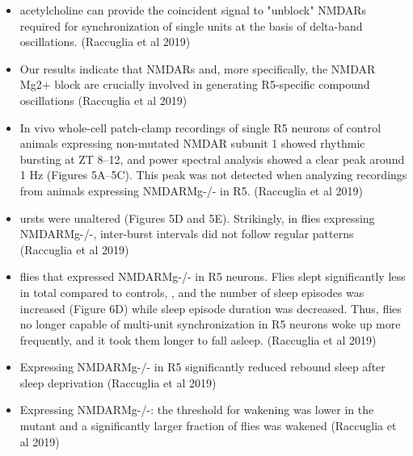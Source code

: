 \documentclass[11pt]{article}
\begin{document}
\begin{itemize}
    \item acetylcholine can provide the coincident signal to "unblock" NMDARs required for synchronization of single units at the basis of delta-band oscillations.
    \cite{raccugliaNetworkSpecificSynchronizationElectrical2019} (Raccuglia et al 2019)

    \item Our results indicate that NMDARs and, more specifically, the NMDAR Mg2+ block are crucially involved in generating R5-specific compound oscillations
    \cite{raccugliaNetworkSpecificSynchronizationElectrical2019} (Raccuglia et al 2019)

    \item In vivo whole-cell patch-clamp recordings of single R5 neurons of control animals expressing non-mutated NMDAR subunit 1 showed rhythmic bursting at ZT 8–12, and power spectral analysis showed a clear peak around 1 Hz (Figures 5A–5C). This peak was not detected when analyzing recordings from animals expressing NMDARMg-/- in R5.
    \cite{raccugliaNetworkSpecificSynchronizationElectrical2019} (Raccuglia et al 2019)

    \item ursts were unaltered (Figures 5D and 5E). Strikingly, in flies expressing NMDARMg-/-, inter-burst intervals did not follow regular patterns
    \cite{raccugliaNetworkSpecificSynchronizationElectrical2019} (Raccuglia et al 2019)

    \item flies that expressed NMDARMg-/- in R5 neurons. Flies slept significantly less in total compared to controls, , and the number of sleep episodes was increased (Figure 6D) while sleep episode duration was decreased.
    Thus, flies no longer capable of multi-unit synchronization in R5 neurons woke up more frequently, and it took them longer to fall asleep.
    \cite{raccugliaNetworkSpecificSynchronizationElectrical2019} (Raccuglia et al 2019)

    \item Expressing NMDARMg-/- in R5 significantly reduced rebound sleep after sleep deprivation
    \cite{raccugliaNetworkSpecificSynchronizationElectrical2019} (Raccuglia et al 2019)

    \item Expressing NMDARMg-/-: the threshold for wakening was lower in the mutant and a significantly larger fraction of flies was wakened
    \cite{raccugliaNetworkSpecificSynchronizationElectrical2019} (Raccuglia et al 2019)


\end{itemize}
\end{document}
